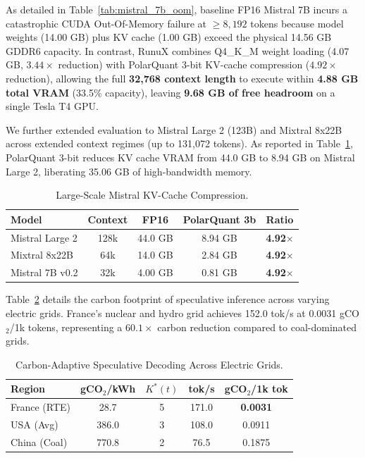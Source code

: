 \documentclass[10pt,twocolumn]{article}
\begin{document}
As detailed in Table~\ref{tab:mistral_7b_oom}, baseline FP16 Mistral 7B incurs a catastrophic CUDA Out-Of-Memory failure at $\ge 8,192$ tokens because model weights (14.00 GB) plus KV cache (1.00 GB) exceed the physical 14.56 GB GDDR6 capacity. In contrast, RunuX combines Q4\_K\_M weight loading (4.07 GB, $3.44\times$ reduction) with PolarQuant 3-bit KV-cache compression ($4.92\times$ reduction), allowing the full \textbf{32,768 context length} to execute within \textbf{4.88 GB total VRAM} (33.5\% capacity), leaving \textbf{9.68 GB of free headroom} on a single Tesla T4 GPU.

We further extended evaluation to Mistral Large 2 (123B) and Mixtral 8x22B across extended context regimes (up to 131,072 tokens). As reported in Table~\ref{tab:mistral_kv}, PolarQuant 3-bit reduces KV cache VRAM from 44.0 GB to 8.94 GB on Mistral Large 2, liberating 35.06 GB of high-bandwidth memory.

\begin{table}[h]
\centering
\small
\caption{Large-Scale Mistral KV-Cache Compression.}
\label{tab:mistral_kv}
\begin{tabular}{lcccc}
\toprule
\textbf{Model} & \textbf{Context} & \textbf{FP16} & \textbf{PolarQuant 3b} & \textbf{Ratio} \\
\midrule
Mistral Large 2 & 128k & 44.0 GB & 8.94 GB & \textbf{4.92$\times$} \\
Mixtral 8x22B   & 64k  & 14.0 GB & 2.84 GB & \textbf{4.92$\times$} \\
Mistral 7B v0.2 & 32k  & 4.00 GB & 0.81 GB & \textbf{4.92$\times$} \\
\bottomrule
\end{tabular}
\end{table}

Table~\ref{tab:carbon} details the carbon footprint of speculative inference across varying electric grids. France's nuclear and hydro grid achieves 152.0 tok/s at 0.0031 gCO$_2$/1k tokens, representing a $60.1\times$ carbon reduction compared to coal-dominated grids.

\begin{table}[h]
\centering
\small
\caption{Carbon-Adaptive Speculative Decoding Across Electric Grids.}
\label{tab:carbon}
\begin{tabular}{lcccc}
\toprule
\textbf{Region} & \textbf{gCO$_2$/kWh} & $K^*(t)$ & \textbf{tok/s} & \textbf{gCO$_2$/1k tok} \\
\midrule
France (RTE) & 28.7  & 5 & 171.0 & \textbf{0.0031} \\
USA (Avg)    & 386.0 & 3 & 108.0 & 0.0911 \\
China (Coal) & 770.8 & 2 & 76.5  & 0.1875 \\
\bottomrule
\end{tabular}
\end{table}
\end{document}
